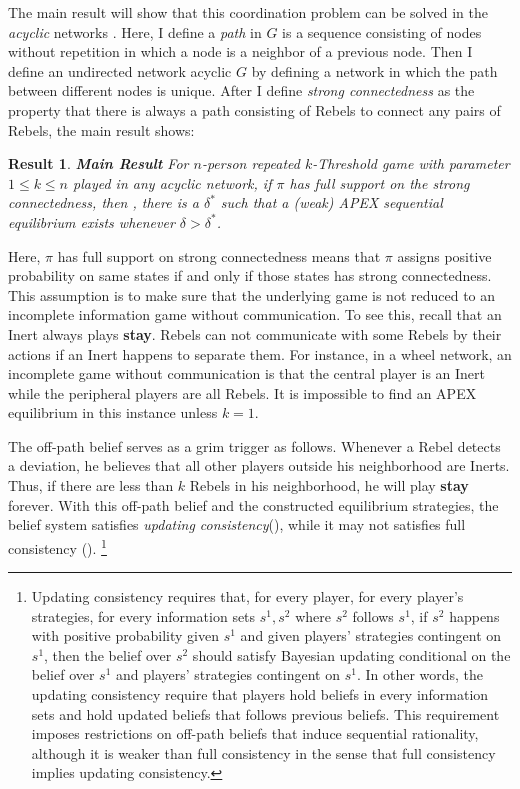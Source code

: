 \documentclass[12pt,letter]{article}
\newtheorem{result}{Result}
\theoremstyle{definition}
\theoremstyle{remark}
\theoremstyle{claim}
\begin{document}
The main result will show that this coordination problem can be solved in the \textit{acyclic} networks . Here, I define a \textit{path} in $G$ is a sequence consisting of nodes without repetition in which a node is a neighbor of a previous node. Then I define an undirected network acyclic $G$ by defining a network in which the path between different nodes is unique. After I define \textit{strong connectedness} as the property that there is always a path consisting of Rebels to connect any pairs of Rebels,  the main result shows:

\begin{result}\textbf{Main Result}
For $n$-person repeated $k$-Threshold game with parameter $1\leq k \leq n$ played in any acyclic network, if $\pi$ has full support on the strong connectedness, then , there is a $\delta^{*}$ such that a (weak) APEX sequential equilibrium exists whenever $\delta>\delta^{*}$.  
\end{result}

Here, $\pi$ has full support on strong connectedness means that $\pi$ assigns positive probability on same states if and only if those states has strong connectedness. This assumption is to make sure that the underlying game is not reduced to an incomplete information game without communication.  To see this, recall that an Inert always plays \textbf{stay}. Rebels can not communicate with some Rebels by their actions if an Inert happens to separate them. For instance, in a wheel network, an incomplete game without communication is that the central player is an Inert while the peripheral players are all Rebels. It is impossible to find an APEX equilibrium in this instance unless $k=1$.

The off-path belief serves as a grim trigger as follows. Whenever a Rebel detects a deviation, he believes that all other players outside his neighborhood are Inerts. Thus, if there are less than $k$ Rebels in his neighborhood, he will play \textbf{stay} forever. With this off-path belief and the constructed equilibrium strategies, the belief system satisfies \textit{updating consistency}(\citep{Perea2002}), while it may not satisfies full consistency (\citep{Krep_Wilson1982}). \footnote{ Updating consistency requires that, for every player, for every player's strategies, for every information sets $s^1,s^2$ where $s^2$ follows $s^1$, if $s^2$ happens with positive probability given $s^1$ and given players' strategies contingent on $s^1$, then the belief over $s^2$ should satisfy Bayesian updating conditional on the belief over $s^1$ and players' strategies contingent on $s^1$. In other words, the updating consistency require that players hold beliefs in every information sets and hold updated beliefs that follows previous beliefs. This requirement imposes restrictions on off-path beliefs that induce sequential rationality, although it is weaker than full consistency in the sense that full consistency implies updating consistency.}
\end{document}
